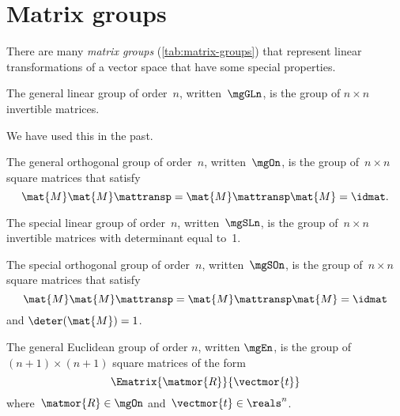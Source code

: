 \section{Matrix groups}


There are many \emph{matrix groups} (\cref{tab:matrix-groups}) that represent linear transformations of a vector space that have some special properties.

\begin{definition}
    \label{def:general-linear-group}
    The general linear group of order~$n$, written~$\mgGLn$, is the group of $n\times n$ invertible matrices.
\end{definition}

We have used this in the past.

\begin{definition}
    \label{def:general-orthogonal-group}
    The general orthogonal group of order~$n$, written~$\mgOn$, is the group of~$n\times n$ square matrices that satisfy
    \begin{equation}
        \mat{M} \mat{M}\mattransp = \mat{M}\mattransp \mat{M} = \idmat.
    \end{equation}
\end{definition}


\begin{definition}
    \label{def:special-linear-group}
    The special linear group of order~$n$, written~$\mgSLn$, is the group of~$n\times n$ invertible matrices with determinant equal to~1.
\end{definition}
\begin{definition}
    \label{def:special-orthogonal-group}
    The special orthogonal group of order~$n$, written~$\mgSOn$, is the group of~$n\times n$ square matrices that satisfy
    \begin{equation}
        \mat{M} \mat{M}\mattransp = \mat{M}\mattransp \mat{M} = \idmat
    \end{equation}
    and $\deter(\mat{M}) = 1$.
\end{definition}

\begin{definition}
    \label{def:general-euclidean-group}
    The general Euclidean group of order $n$, written $\mgEn$, is the group of $(n+1)\times (n+1)$ square matrices of the form
    \begin{equation}
        \label{eq:En-def}
        \Ematrix{\matmor{R}}{\vectmor{t}}
    \end{equation}
    where~$\matmor{R}\in \mgOn$ and~$\vectmor{t} \in \reals^n$.
\end{definition}



